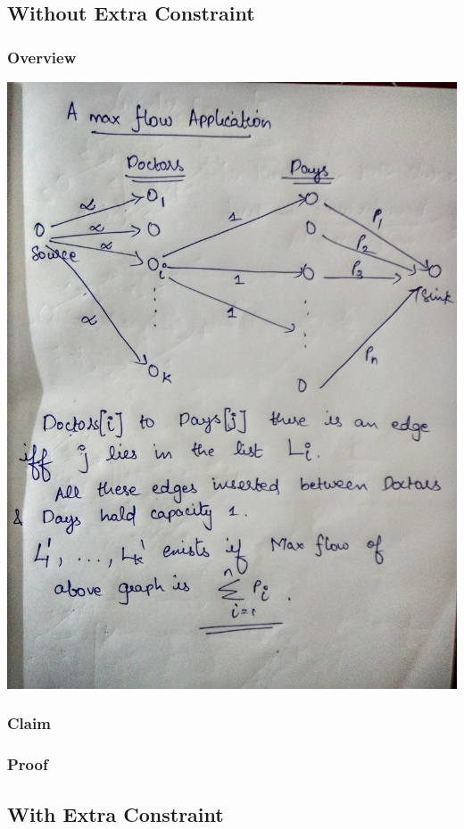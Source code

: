 \documentclass{article}
\begin{document}
\subsection{Without Extra Constraint}
\subsubsection{Overview}
\includegraphics[scale=0.15]{3a.jpg}
\subsubsection{Claim}
\subsubsection{Proof}
\newpage
\subsection{With Extra Constraint}
\end{document}
